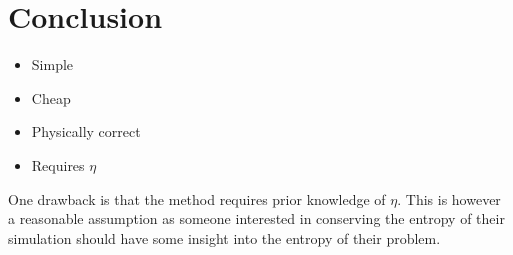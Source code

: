 \documentclass{report}
\newcommand{\norm}[1]{\left\lVert#1\right\rVert}
\newcommand{\inner}[2]{\left< #1 , #2 \right>}
\begin{document}
\chapter{Conclusion}
    \begin{itemize}
        \item Simple
        \item Cheap
        \item Physically correct
        \item Requires \(\eta\)
    \end{itemize}

One drawback is that the method requires prior knowledge of \(\eta\). This is however a reasonable assumption as someone interested in conserving the entropy of their simulation should have some insight into the entropy of their problem.

{}

\end{document}
